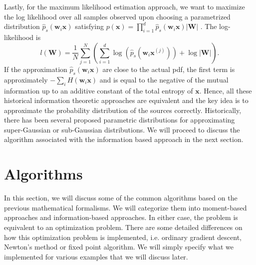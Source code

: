 \documentclass[aps,prl,preprint,superscriptaddress]{revtex4-2}
\begin{document}
Lastly, for the maximum likelihood estimation approach, we want to maximize the log likelihood over all samples observed upon choosing a parametrized distribution $\hat{p}_{s}(\mathbf{w}_{i}\mathbf{x})$ satisfying $p(\mathbf{x}) = \prod_{i=1}^{d}\hat{p}_{s}(\mathbf{w}_{i}\mathbf{x})|\mathbf{W}|$ \cite{ng_cs229}. The log-likelihood is 
\begin{equation}
l(\mathbf{W}) = \frac{1}{N}\sum_{j=1}^{N}(\sum_{i=1}^{d}\log(\hat{p}_{s}(\mathbf{w}_{i}\mathbf{x}^{(j)}))+\log|\mathbf{W}|).
\end{equation}   
If the approximation $\hat{p}_{s}(\mathbf{w}_{i}\mathbf{x})$ are close to the actual pdf, the first term is approximately $-\sum_{i}H(\mathbf{w}_{i}\mathbf{x})$ and is equal to the negative of the mutual information up to an additive constant of the total entropy of $\mathbf{x}$. Hence, all these historical information theoretic approaches are equivalent and the key idea is to approximate the probability distribution of the sources correctly. Historically, there has been several proposed parametric distributions for approximating super-Gaussian or sub-Gaussian distributions. We will proceed to discuss the algorithm associated with the information based approach in the next section. 

\section{Algorithms}
In this section, we will discuss some of the common algorithms based on the previous mathematical formalisms. We will categorize them into moment-based approaches and information-based approaches. In either case, the problem is equivalent to an optimization problem. There are some detailed differences on how this optimization problem is implemented, i.e. ordinary gradient descent, Newton's method or fixed point algorithm. We will simply specify what we implemented for various examples that we will discuss later. 
\end{document}
